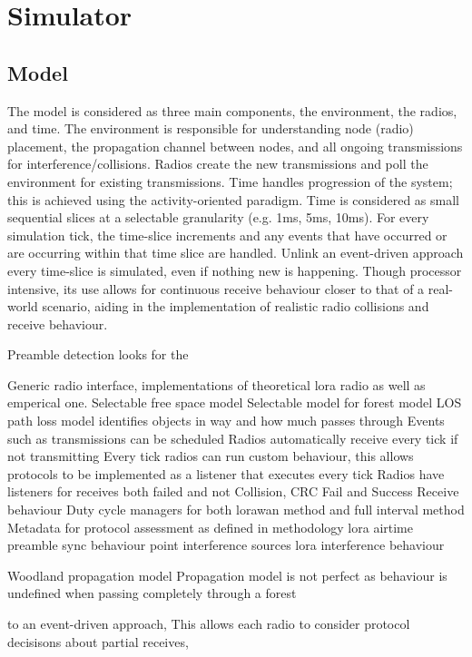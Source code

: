 \section{Simulator}

\subsection{Model}
The model is considered as three main components, the environment, the radios, and time. The environment is responsible for understanding node (radio) placement, the propagation channel between nodes, and all ongoing transmissions for interference/collisions. Radios create the new transmissions and poll the environment for existing transmissions. Time handles progression of the system; this is achieved using the activity-oriented paradigm. Time is considered as small sequential slices at a selectable granularity (e.g. 1ms, 5ms, 10ms). For every simulation tick, the time-slice increments and any events that have occurred or are occurring within that time slice are handled. Unlink an event-driven approach every time-slice is simulated, even if nothing new is happening. Though processor intensive, its use allows for continuous receive behaviour closer to that of a real-world scenario, aiding in the implementation of realistic radio collisions and receive behaviour.

Preamble detection looks for the 

Generic radio interface, implementations of theoretical \ac{lora} radio as well as emperical one.
Selectable free space model
Selectable model for forest model
LOS path loss model identifies objects in way and how much passes through
Events such as transmissions can be scheduled
Radios automatically receive every tick if not transmitting
Every tick radios can run custom behaviour, this allows protocols to be implemented as a listener that executes every tick
Radios have listeners for receives both failed and not
Collision, CRC Fail and Success Receive behaviour
Duty cycle managers for both lorawan method and full interval method
Metadata for protocol assessment as defined in methodology 
lora airtime
preamble sync behaviour
point interference sources
lora interference behaviour

Woodland propagation model
Propagation model is not perfect as behaviour is undefined when passing completely through a forest


to an event-driven approach,  This allows each radio to consider  protocol decisisons about partial receives, 


